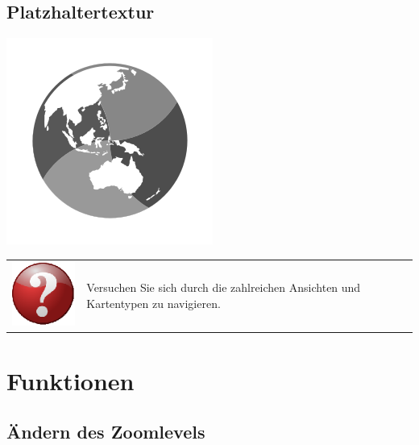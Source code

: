 \documentclass[10pt]{scrreprt}
\begin{document}
\vspace{3mm}
\section*{Platzhaltertextur} 

\vspace{3mm}
\begin{center}
\includegraphics[scale=0.3]{images/placeholder.png}
\end{center}



\vspace{3mm}
\begin{tabular}{>{\centering \arraybackslash}m{1cm} m{14cm}}
\includegraphics[scale=0.5]{images/quest.eps} &  Versuchen Sie sich durch die zahlreichen Ansichten und Kartentypen zu navigieren.
\end{tabular}












\chapter{Funktionen}

\vspace{3mm}
\section{Ändern des Zoomlevels}
\end{document}

